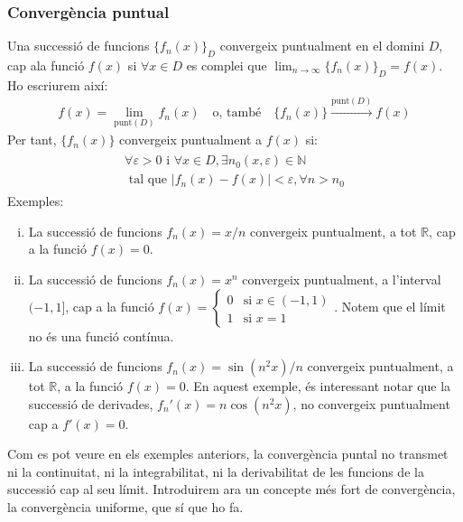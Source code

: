 \subsubsection*{Convergència puntual}
Una successió de funcions $\{ f_{n} (x) \}_{D}$ convergeix puntualment en el domini $D$, cap ala funció $f(x)$ si $\forall x \in D$ es complei que $\lim_{n \to \infty} \{ f_{n} (x) \}_{D} = f(x)$. Ho escriurem així:
\begin{align}
    f(x) = \lim_{\text{punt}(D)} f_{n}(x) \quad \text{o, també} \quad \{ f_{n} (x)\} \overset{\text{punt}(D)}{\longrightarrow} f(x)
\end{align}
Per tant, $\{f_{n}(x)\}$ convergeix puntualment a $f(x)$ si:
\begin{align}
    \begin{gathered}
        \forall \varepsilon > 0 \text{ i } \forall x \in D, \exists n_{0}(x,\varepsilon) \in \mathbb{N} \\
        \text{ tal que } |f_{n} (x) - f(x) | < \varepsilon, \forall n > n_{0}
    \end{gathered}
\end{align}
Exemples:
\begin{enumerate}[i)]
    \item La successió de funcions $f_{n}(x) = x/n$ convergeix puntualment, a tot $\mathbb{R}$, cap a la funció $f(x) = 0$.
    \item La successió de funcions $f_{n}(x) = x^{n}$ convergeix puntualment, a l'interval $(-1, 1]$, cap a la funció $f(x) = \begin{cases} 0 & \text{si } x \in (-1,1) \\ 1 & \text{si } x = 1 \end{cases}$. Notem que el límit no és una funció contínua.
    \item La successió de funcions $f_{n} (x) = \sin (n^{2}x)/n$ convergeix puntualment, a tot $\mathbb{R}$, a la funció $f(x) = 0$. En aquest exemple, és interessant notar que la successió de derivades, $f_{n}'(x) = n \cos (n^{2} x)$, no convergeix puntualment cap a $f'(x) = 0$.
\end{enumerate}
Com es pot veure en els exemples anteriors, la convergència puntal no transmet ni la continuitat, ni la integrabilitat, ni la derivabilitat de les funcions de la successió cap al seu límit. Introduirem ara un concepte més fort de convergència, la convergència uniforme, que sí que ho fa.

